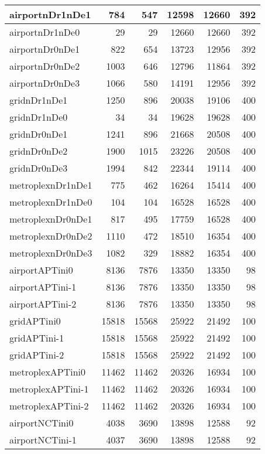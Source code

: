 \begin{longtable}{|l|r|r|r|r|r|}
\endlastfoot
airportnDr1nDe1 & 784 & 547 & 12598 & 12660 & 392 \\ \hline
airportnDr1nDe0 & 29 & 29 & 12660 & 12660 & 392 \\ \hline
airportnDr0nDe1 & 822 & 654 & 13723 & 12956 & 392 \\ \hline
airportnDr0nDe2 & 1003 & 646 & 12796 & 11864 & 392 \\ \hline
airportnDr0nDe3 & 1066 & 580 & 14191 & 12956 & 392 \\ \hline
gridnDr1nDe1 & 1250 & 896 & 20038 & 19106 & 400 \\ \hline
gridnDr1nDe0 & 34 & 34 & 19628 & 19628 & 400 \\ \hline
gridnDr0nDe1 & 1241 & 896 & 21668 & 20508 & 400 \\ \hline
gridnDr0nDe2 & 1900 & 1015 & 23226 & 20508 & 400 \\ \hline
gridnDr0nDe3 & 1994 & 842 & 22344 & 19114 & 400 \\ \hline
metroplexnDr1nDe1 & 775 & 462 & 16264 & 15414 & 400 \\ \hline
metroplexnDr1nDe0 & 104 & 104 & 16528 & 16528 & 400 \\ \hline
metroplexnDr0nDe1 & 817 & 495 & 17759 & 16528 & 400 \\ \hline
metroplexnDr0nDe2 & 1110 & 472 & 18510 & 16354 & 400 \\ \hline
metroplexnDr0nDe3 & 1082 & 329 & 18882 & 16354 & 400 \\ \hline
airportAPTini0 & 8136 & 7876 & 13350 & 13350 & 98 \\ \hline
airportAPTini-1 & 8136 & 7876 & 13350 & 13350 & 98 \\ \hline
airportAPTini-2 & 8136 & 7876 & 13350 & 13350 & 98 \\ \hline
gridAPTini0 & 15818 & 15568 & 25922 & 21492 & 100 \\ \hline
gridAPTini-1 & 15818 & 15568 & 25922 & 21492 & 100 \\ \hline
gridAPTini-2 & 15818 & 15568 & 25922 & 21492 & 100 \\ \hline
metroplexAPTini0 & 11462 & 11462 & 20326 & 16934 & 100 \\ \hline
metroplexAPTini-1 & 11462 & 11462 & 20326 & 16934 & 100 \\ \hline
metroplexAPTini-2 & 11462 & 11462 & 20326 & 16934 & 100 \\ \hline
airportNCTini0 & 4038 & 3690 & 13898 & 12588 & 92 \\ \hline
airportNCTini-1 & 4037 & 3690 & 13898 & 12588 & 92 \\ \hline

\end{longtable}
